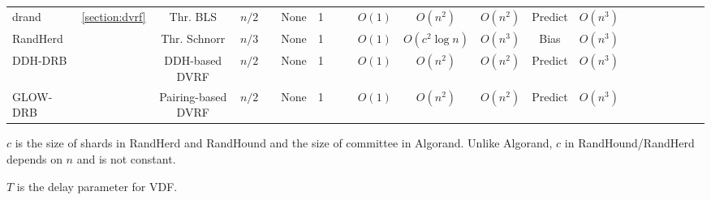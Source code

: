 \documentclass[letterpaper,twocolumn,10pt]{article}
\newcommand{\cmark}{\ding{51}}
\newcommand{\xmark}{\ding{55}}
\theoremstyle{definition}
\theoremstyle{remark}
\begin{document}
\begin{table*}[pt]
\begin{threeparttable}
\begin{tabularx}{\textwidth}{@{} l *{20}c}
\midrule
drand & \multirow{4}{*}{\ref{section:dvrf}} & Thr. BLS & $n/2$   & \xmark   & None   & 1   & \cmark    & \cmark   & $O(1)$  & $O(n^2)$   & $O(n^2)$  & Predict & $O(n^3)$ \\ 
RandHerd &  & Thr. Schnorr & $n/3$   & \xmark   & None   & 1   & \xmark    & \xmark   & $O(1)$  & $O(c^2 \log n)$   & $O(n^3)$  & Bias & $O(n^3)$ \\ 
DDH-DRB &  & DDH-based DVRF  & $n/2$ & \xmark   & None   & 1   & \cmark    & \cmark   & $O(1)$  & $O(n^2)$   & $O(n^2)$  & Predict & $O(n^3)$ \\ 
GLOW-DRB &  & Pairing-based DVRF  & $n/2$ & \xmark   & None   & 1   & \cmark    & \cmark   & $O(1)$  & $O(n^2)$   & $O(n^2)$  & Predict & $O(n^3)$ \\ 
\bottomrule
\end{tabularx}
\begin{tablenotes}[flushleft]
\item $c$ is the size of shards in RandHerd and RandHound and the size of committee in Algorand. Unlike Algorand, $c$ in RandHound/RandHerd depends on $n$ and is not constant.
\item $T$ is the delay parameter for VDF.
\end{tablenotes}
\end{threeparttable}
\end{table*}
\end{document}
